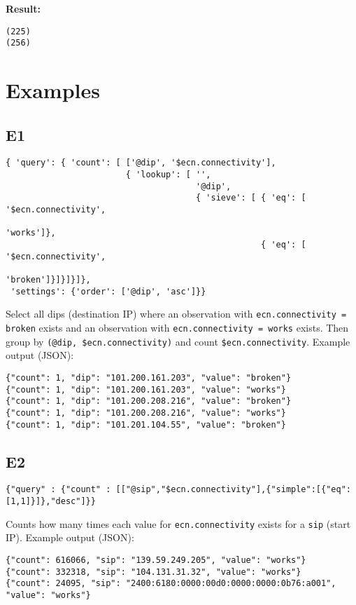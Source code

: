 \documentclass[a4paper]{article}
\begin{document}
\textbf{Result:}

\begin{verbatim}
(225)
(256)
\end{verbatim}

\section{Examples}

\subsection{E1}

\tiny
\begin{verbatim}
{ 'query': { 'count': [ ['@dip', '$ecn.connectivity'],
                        { 'lookup': [ '',
                                      '@dip',
                                      { 'sieve': [ { 'eq': [ '$ecn.connectivity',
                                                             'works']},
                                                   { 'eq': [ '$ecn.connectivity',
                                                             'broken']}]}]}]},
 'settings': {'order': ['@dip', 'asc']}}
\end{verbatim}
\normalsize

Select all dips (destination IP) where an observation with
\verb|ecn.connectivity = broken| exists and an observation with
\verb|ecn.connectivity = works| exists.  Then group by
\verb|(@dip, $ecn.connectivity)| and count
\verb|$ecn.connectivity|. Example output (JSON):

\begin{tiny}
\begin{verbatim}
{"count": 1, "dip": "101.200.161.203", "value": "broken"}
{"count": 1, "dip": "101.200.161.203", "value": "works"}
{"count": 1, "dip": "101.200.208.216", "value": "broken"}
{"count": 1, "dip": "101.200.208.216", "value": "works"}
{"count": 1, "dip": "101.201.104.55", "value": "broken"}
\end{verbatim}
\end{tiny}

\subsection{E2}

\begin{tiny}
\begin{verbatim}
{"query" : {"count" : [["@sip","$ecn.connectivity"],{"simple":[{"eq":[1,1]}]},"desc"]}}
\end{verbatim}
\end{tiny}

Counts how many times each value for \verb|ecn.connectivity| exists
for a \verb|sip| (start IP). Example output (JSON):

\begin{tiny}
\begin{verbatim}
{"count": 616066, "sip": "139.59.249.205", "value": "works"}
{"count": 332318, "sip": "104.131.31.32", "value": "works"}
{"count": 24095, "sip": "2400:6180:0000:00d0:0000:0000:0b76:a001", "value": "works"}
\end{verbatim}
\end{tiny}
\end{document}
